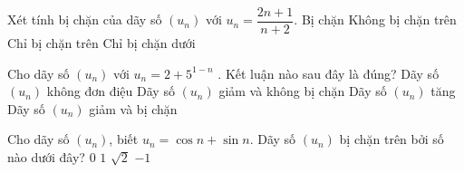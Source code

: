 \begin{ex}%
	Xét tính bị chặn của dãy số $(u_n)$ với $u_n=\dfrac{2n+1}{n+2}$. 
	\choice 
		 {\True Bị chặn}
		{Không bị chặn trên } 
		{Chỉ  bị chặn trên}
		{Chỉ bị  chặn dưới}
\end{ex}

\begin{ex}%
	Cho dãy số $\left(u_n\right)$ với  $u_n=2+5^{1-n}$ . Kết luận nào sau đây là đúng?
	\choice 
		{Dãy số $\left(u_n\right)$ không đơn điệu} 
		{Dãy số $\left(u_n\right)$ giảm và  không bị chặn}
		{Dãy số  $\left(u_n\right)$ tăng}
		{\True  Dãy số $\left(u_n\right)$ giảm và bị chặn}
\end{ex}

\begin{ex}%
	Cho dãy số $\left(u_n\right)$, biết $u_n=\cos n+\sin n.$ Dãy số $\left(u_n\right)$ bị chặn  trên bởi số nào dưới đây?
	\choice 
		 {$0$}
		 {$1$}
		 {\True $\sqrt{2}$}
		{$-1$} 
\end{ex}

